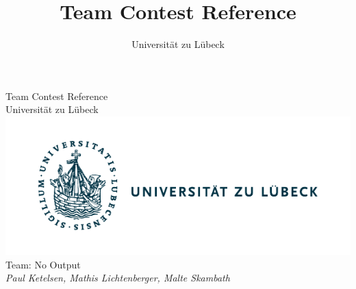 \documentclass[10pt,a4paper,ngerman,oneside,]{article}
\title{Team Contest Reference}
\author{Universität zu Lübeck}
\begin{document}
\lstset{basicstyle=\ttfamily\footnotesize,numbers=left,numberstyle=\tiny,tabsize=2,numbersep=5pt}
\begin{center}
	{\large Team Contest Reference}\\
	Universität zu Lübeck\\
	\includegraphics[scale=.8,clip,trim=.4cm 0cm 6.4cm 0cm,scale=0.89]{img/logo_uzl.pdf}\\
	Team: { No Output }\\
\itshape	Paul Ketelsen, Mathis Lichtenberger, Malte Skambath\\
\end{center}
\end{document}
